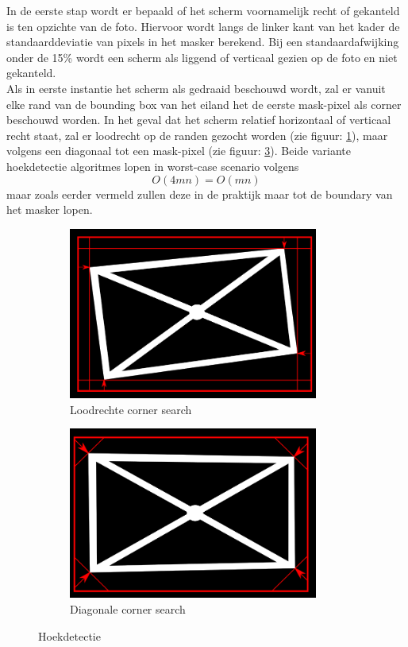 In de eerste stap wordt er bepaald of het scherm voornamelijk recht of gekanteld is ten opzichte van de foto. Hiervoor wordt langs de linker kant van het kader de standaarddeviatie van pixels in het masker berekend. Bij een standaardafwijking onder de 15\% wordt een scherm als liggend of verticaal gezien op de foto en niet gekanteld.\\
Als in eerste instantie het scherm als gedraaid beschouwd wordt, zal er vanuit elke rand van de bounding box van het eiland het de eerste mask-pixel als corner beschouwd worden. In het geval dat het scherm relatief horizontaal of verticaal recht staat, zal er loodrecht op de randen gezocht worden (zie figuur: \ref{fig:perp search}), maar volgens een diagonaal tot een mask-pixel (zie figuur: \ref{fig:diag search}). Beide variante hoekdetectie algoritmes lopen in worst-case scenario volgens
\[O(4mn)=O(mn)\]
maar zoals eerder vermeld zullen deze in de praktijk maar tot de boundary van het masker lopen.\\
\begin{figure}[h] 
\centering
\begin{subfigure}{0.5\textwidth}
\centering
\includegraphics[width=0.9\textwidth]{img/perpSearch.png}
\caption{Loodrechte corner search}
\label{fig:perp search}
\end{subfigure}%
\begin{subfigure}{0.5\textwidth}
\centering
\includegraphics[width=0.9\textwidth]{img/diagSearch.png}
\caption{Diagonale corner search}
\label{fig:diag search}
\end{subfigure}
\caption{Hoekdetectie}
\end{figure}


